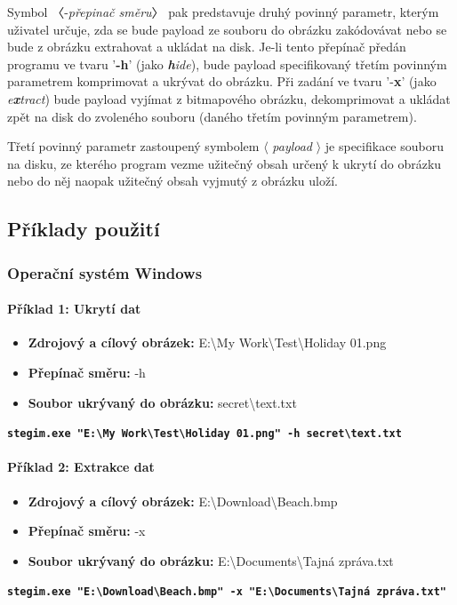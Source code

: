 \documentclass[12pt]{report}
\begin{document}
    Symbol 〈-\textit{přepinač směru}〉 pak predstavuje druhý povinný parametr, kterým uživatel určuje, zda se bude payload ze souboru do obrázku zakódovávat nebo se bude z obrázku extrahovat a ukládat na disk. Je-li tento přepínač předán programu ve tvaru '\textbf{-h}' (jako\textit{ \textbf{h}ide}), bude payload specifikovaný třetím povinným parametrem komprimovat a ukrývat do obrázku. Při zadání ve tvaru '-\textbf{x}' (jako \textit{e\textbf{x}tract}) bude payload vyjímat z bitmapového obrázku, dekomprimovat a ukládat zpět na disk do zvoleného souboru (daného třetím povinným parametrem).

    Třetí povinný parametr zastoupený symbolem $\langle$ \textit{payload} $\rangle$ je specifikace souboru na disku, ze kterého program vezme užitečný obsah určený k ukrytí do obrázku nebo do něj naopak užitečný obsah vyjmutý z obrázku uloží.

    \subsection{Příklady použití}

    \subsubsection{Operační systém Windows}

    \paragraph{Příklad 1: Ukrytí dat}
    \begin{itemize}
        \item \textbf{Zdrojový a cílový obrázek:} E:\textbackslash My Work\textbackslash Test\textbackslash Holiday 01.png
        \item \textbf{Přepínač směru:} -h
        \item \textbf{Soubor ukrývaný do obrázku:} secret\textbackslash text.txt
    \end{itemize}
     \texttt{\textbf{stegim.exe "E:\textbackslash My Work\textbackslash Test\textbackslash Holiday 01.png" -h secret\textbackslash text.txt}}

    \paragraph{Příklad 2: Extrakce dat}
    \begin{itemize}
        \item \textbf{Zdrojový a cílový obrázek:} E:\textbackslash Download\textbackslash Beach.bmp
        \item \textbf{Přepínač směru:} -x
        \item \textbf{Soubor ukrývaný do obrázku:} E:\textbackslash Documents\textbackslash Tajná zpráva.txt
    
    \end{itemize}
    \texttt{\textbf{stegim.exe "E:\textbackslash Download\textbackslash Beach.bmp" -x "E:\textbackslash Documents\textbackslash Tajná zpráva.txt"}}
\end{document}
